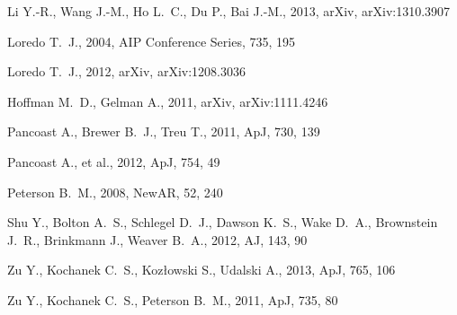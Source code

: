 \documentclass[useAMS,usenatbib]{mn2e}
\begin{document}
\begin{thebibliography}{99}
 Li 
Y.-R., Wang J.-M., Ho L.~C., Du P., Bai J.-M., 2013, arXiv, arXiv:1310.3907 

 Loredo 
T.~J., 2004, AIP Conference Series, 735, 195 

 Loredo 
T.~J., 2012, arXiv, arXiv:1208.3036 

 Hoffman M.~D., Gelman A., 2011, arXiv, arXiv:1111.4246 

 Pancoast A., Brewer B.~J., Treu T., 2011, ApJ, 730, 139 

 Pancoast A., et al., 2012, ApJ, 754, 49 

Peterson B.~M., 2008, NewAR, 52, 240 

Shu Y., Bolton A.~S., Schlegel D.~J., Dawson K.~S., Wake D.~A., Brownstein 
J.~R., Brinkmann J., Weaver B.~A., 2012, AJ, 143, 90 

 Zu 
Y., Kochanek C.~S., Koz{\l}owski S., Udalski A., 2013, ApJ, 765, 106 

 Zu Y., Kochanek C.~S., Peterson B.~M., 2011, ApJ, 735, 80 



\end{thebibliography}
\end{document}
